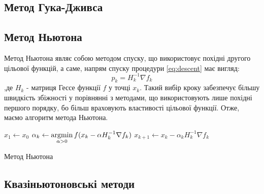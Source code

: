 \subsection*{Метод Гука-Дживса}

\subsection*{Метод Ньютона}

Метод Ньютона являє собою методом спуску, що використовує
похідні другого цільової функцій, а саме, напрям спуску
процедури \ref{eq:descent} має вигляд:
\begin{equation}
    p_k = H^{-1}_k \nabla f_k
\end{equation} \label{eq:newton}
,де $H_k$ - матриця Гессе функції $f$ у точці $x_k$.
Такий вибір кроку забезпечує більшу швидкість збіжності у
порівнянні з методами, що використовують лише похідні першого порядку,
бо більш враховують властивості цільової функції.
Отже, маємо алгоритм метода Ньютона.

\begin{algorithm}[H] \label{alg:newton}
    \SetAlgoLined
    $x_1 \leftarrow x_0$\;
    {
        $\alpha_k \leftarrow \mathop{\mathrm{argmin}}\limits_{\alpha > 0} f(x_{k} - \alpha H^{-1}_k \nabla f_{k})$\;
        $x_{k+1} \leftarrow x_{k} - \alpha_k H^{-1}_k \nabla f_{k}$\;
    }
    \caption{Метод Ньютона}
\end{algorithm}

\subsection*{Квазіньютоновські методи}

